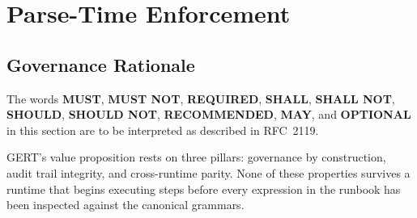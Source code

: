 
\section{Parse-Time Enforcement}
\label{sec:parse-gate}

\subsection{Governance Rationale}
\label{sec:parse-gate:rationale}

The words \textbf{MUST}, \textbf{MUST NOT}, \textbf{REQUIRED}, \textbf{SHALL},
\textbf{SHALL NOT}, \textbf{SHOULD}, \textbf{SHOULD NOT}, \textbf{RECOMMENDED},
\textbf{MAY}, and \textbf{OPTIONAL} in this section are to be interpreted as
described in RFC~2119.

GERT's value proposition rests on three pillars: governance by construction,
audit trail integrity, and cross-runtime parity.  None of these properties
survives a runtime that begins executing steps before every expression in the
runbook has been inspected against the canonical grammars.

